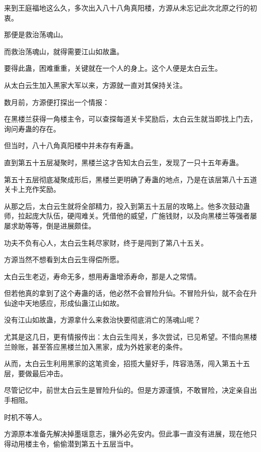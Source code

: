
\begin{this_body}



来到王庭福地这么久，多次出入八十八角真阳楼，方源从未忘记此次北原之行的初衷。

那便是救治荡魂山。

而救治荡魂山，就得需要江山如故蛊。

要得此蛊，困难重重，关键就在一个人的身上。这个人便是太白云生。

从太白云生加入黑家大军以来，方源就一直对其保持关注。

数月前，方源便打探出一个情报：

在黑楼兰获得一角楼主令，可以查探每道关卡奖励后，太白云生就当即找上门去，询问寿蛊的存在。

但当时，八十八角真阳楼中并未存有寿蛊。

直到第五十五层凝聚时，黑楼兰这才告知太白云生，发现了一只十五年寿蛊。

第五十五层彻底凝聚成形后，黑楼兰更明确了寿蛊的地点，乃是在该层第八十五道关卡上充作奖励。

从那之后，太白云生就将全部精力，投入到第五十五层的攻略上。他多次鼓动蛊师，拉起庞大队伍，硬闯难关。凭借他的威望，广施钱财，以及向黑楼兰等强者屡屡求助等等，倒是进展颇佳。

功夫不负有心人，太白云生耗尽家财，终于是闯到了第八十五关。

方源当然不想看到太白云生得偿所愿。

太白云生老迈，寿命无多，想用寿蛊增添寿命，那是人之常情。

但若他真的拿到了这个寿蛊的话，他必然不会冒险升仙。不冒险升仙，就不会在升仙途中天地感应，形成仙蛊江山如故。

没有江山如故蛊，方源拿什么来救治快要彻底消亡的荡魂山呢？

尤其是这几日，更有情报传出：太白云生闯关，多次尝试，已见希望。不惜向黑楼兰赊账，甚至答应黑楼兰加入黑家，成为外姓家老的条件。

从而，太白云生利用黑家的这笔资金，招揽大量好手，阵容浩荡，闯入第五十五层，要做最后冲击。

尽管记忆中，前世太白云生是冒险升仙的。但是方源谨慎，不敢冒险，决定亲自出手相阻。

时机不等人。

方源原本准备先解决掉墨瑶意志，攘外必先安内。但此事一直没有进展，现在他只得动用楼主令，偷偷潜到第五十五层当中。


\end{this_body}
